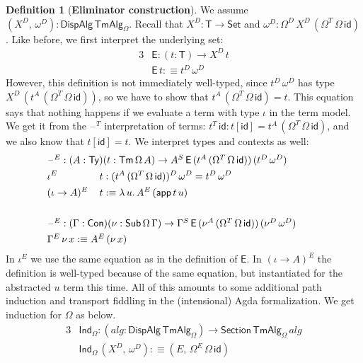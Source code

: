 \documentclass[12pt,a4paper,twoside,openany]{book}
\theoremstyle{remark}
\theoremstyle{definition}
\newtheorem{mydefinition}{Definition}
\newcommand{\mi}[1]{\mathit{#1}}
\newcommand{\ms}[1]{\mathsf{#1}}
\newcommand{\id}{\mathsf{id}}
\newcommand{\Con}{\mathsf{Con}}
\newcommand{\Sub}{\mathsf{Sub}}
\newcommand{\Tm}{\mathsf{Tm}}
\newcommand{\Ty}{\mathsf{Ty}}
\newcommand{\blank}{\mathord{\hspace{1pt}\text{--}\hspace{1pt}}}
\newcommand{\Set}{\mathsf{Set}}
\newcommand{\app}{\ms{app}}
\newcommand{\DispAlg}{\ms{DispAlg}}
\newcommand{\Section}{\ms{Section}}
\newcommand{\TmAlg}{\ms{TmAlg}}
\newcommand{\Ind}{\ms{Ind}}
\newcommand{\defn}{:\equiv}
\begin{document}
\begin{mydefinition}[\textbf{Eliminator construction}]
We assume $(X^D,\,\omega^D) : \DispAlg\,\TmAlg_\Omega$. Recall that $X^D :
\ms{T} \to \Set$ and $\omega^D : \Omega^D\,X^D\,(\Omega^T\,\Omega\,\id)$. Like
before, we first interpret the underlying set:
\begin{alignat*}{3}
  & \ms{E} : (t : \ms{T}) \to X^D\,t \\
  & \ms{E}\,t \defn t^D\,\omega^D
\end{alignat*}
However, this definition is not immediately well-typed, since $t^D\,\omega^D$
has type $X^D\,(t^A\,(\Omega^T\,\Omega\,\id))$, so we have to show that
$t^A\,(\Omega^T\,\Omega\,\id) = t$. This equation says that nothing happens if
we evaluate a term with type $\iota$ in the term model. We get it from the
$\blank^T$ interpretation of terms: $t^T\,\id : t[\id] =
t^A\,(\Omega^T\,\Omega\,\id)$, and we also know that $t[\id] = t$. We interpret types
and contexts as well:
\begin{alignat*}{3}
  & \hspace{-8em}\rlap{$\blank^E : (A : \Ty)(t : \Tm\,\Omega\,A) \to A^S\,\ms{E}\,(t^A\,(\Omega^T\,\Omega\,\id))\,(t^D\,\omega^D)$}\\
  & \hspace{-8em}\iota^E\,&&t : (t^A\,(\Omega^T\,\Omega\,\id))^D\,\omega^D = t^D\,\omega^D\\
  & \hspace{-8em}(\iota\to A)^E\,&&t \defn \lambda\,u.\, A^E\,(\app\,t\,u)\\
  & \hspace{-8em}&& \\
  & \hspace{-8em}\rlap{$\blank^E : (\Gamma : \Con)(\nu : \Sub\,\Omega\,\Gamma) \to \Gamma^S\,\ms{E}\,(\nu^A\,(\Omega^T\,\Omega\,\id))\, (\nu^D\,\omega^D)$}\\
  & \hspace{-8em}\rlap{$\Gamma^E\,\nu\,x \defn A^E\,(\nu\,x)$}
\end{alignat*}
In $\iota^E$ we use the same equation as in the definition of $\ms{E}$. In
$(\iota\to A)^E$ the definition is well-typed because of the same equation, but
instantiated for the abstracted $u$ term this time. All of this amounts to some
additional path induction and transport fiddling in the (intensional) Agda
formalization. We get induction for $\Omega$ as below.
\begin{alignat*}{3}
  &\Ind_{\Omega} : (\mi{alg} : \DispAlg\,\TmAlg_\Omega) \to \Section\,\TmAlg_\Omega\,\mi{alg}\\
  &\Ind_{\Omega}\,(X^D,\,\omega^D) \defn (E,\, \Omega^E\,\Omega\,\id)
\end{alignat*}
\end{mydefinition}
\end{document}
